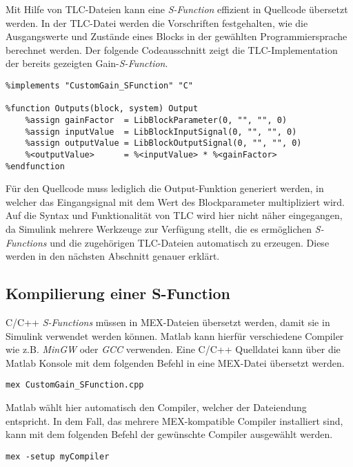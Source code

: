 Mit Hilfe von TLC-Dateien kann eine \textit{S-Function} effizient in Quellcode übersetzt werden. In der TLC-Datei werden die Vorschriften festgehalten, wie die Ausgangswerte und Zustände eines Blocks in der gewählten Programmiersprache berechnet werden. Der folgende Codeausschnitt zeigt die \ac{TLC}-Implementation der bereits gezeigten Gain-\textit{S-Function}.

\begin{lstlisting}
%implements "CustomGain_SFunction" "C"

%function Outputs(block, system) Output
    %assign gainFactor  = LibBlockParameter(0, "", "", 0)
    %assign inputValue  = LibBlockInputSignal(0, "", "", 0)
    %assign outputValue = LibBlockOutputSignal(0, "", "", 0)
    %<outputValue>      = %<inputValue> * %<gainFactor>
%endfunction
\end{lstlisting}

Für den Quellcode muss lediglich die Output-Funktion generiert werden, in welcher das Eingangsignal mit dem Wert des Blockparameter multipliziert wird. Auf die Syntax und Funktionalität von \ac{TLC} wird hier nicht näher eingegangen, da Simulink mehrere Werkzeuge zur Verfügung stellt, die es ermöglichen \textit{S-Functions} und die zugehörigen TLC-Dateien automatisch zu erzeugen. Diese werden in den nächsten Abschnitt genauer erklärt.

\subsection{Kompilierung einer S-Function}
C/C++ \textit{S-Functions} müssen in MEX-Dateien übersetzt werden, damit sie in Simulink verwendet werden können. Matlab kann hierfür verschiedene Compiler wie z.B. \textit{MinGW} oder \textit{GCC} verwenden. Eine C/C++ Quelldatei kann über die Matlab Konsole mit dem folgenden Befehl in eine MEX-Datei übersetzt werden.

\begin{lstlisting}
mex CustomGain_SFunction.cpp
\end{lstlisting}

Matlab wählt hier automatisch den Compiler, welcher der Dateiendung entspricht. In dem Fall, das mehrere MEX-kompatible Compiler installiert sind, kann mit dem folgenden Befehl der gewünschte Compiler ausgewählt werden.

\begin{lstlisting}
mex -setup myCompiler
\end{lstlisting}

